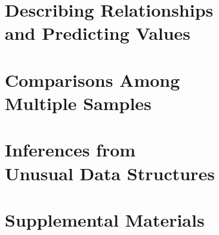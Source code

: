 \documentclass{bookTemplate}
\begin{document}
\part{Describing Relationships\\and Predicting Values}

\part{Comparisons Among\\Multiple Samples}

\part{Inferences from\\Unusual Data Structures}

\part{Supplemental Materials}






\end{document}
